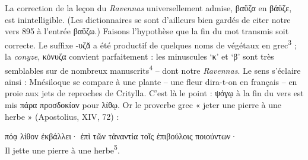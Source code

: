 \documentclass[12pt]{book}%
\newcommand{\italique}[1]{\textit{#1}}%
\newcommand{\citComm}[1]{\begin{quoting}[vskip=0pt] #1 \end{quoting}}%
\newcommand{\marqueur}[1]{\textsuperscript{#1}}%
\newenvironment{groupe}{%
\pstart%
\ledgroup%
}{%
\pend %
}%
\begin{document}
\begin{pages}
\begin{Leftside}
\begin{groupe}
{{La correction de la leçon du \italique{Ravennas} universellement admise, βαϋζα en βάϋζε, est inintelligible. (Les dictionnaires se sont d'ailleurs bien gardés de citer notre vers 895 à l'entrée βαΰζω.)
Faisons l'hypothèse que la fin du mot transmis soit correcte. Le suffixe -υζᾰ a été productif de quelques noms de végétaux en grec\marqueur{3} ; la \italique{conyze}, κόνυζα convient parfaitement : les minuscules `κ' et `β' sont très semblables sur de nombreux manuscrits\marqueur{4} -- dont notre \italique{Ravennas}. 
Le sens s'éclaire ainsi : Mnésiloque se compare à une plante -- une fleur dira-t-on en français -- en proie aux jets de reproches de Critylla. C'est là le point : ψόγῳ à la fin du vers est mis πάρα προσδοκίαν pour λίθῳ. Or le proverbe grec « jeter une pierre à une herbe » (Apostolius, XIV, 72) :%
\citComm{πόᾳ λίθον ἐκβάλλει· ἐπὶ τῶν τἀναντία τοῖς ἐπιβούλοις ποιούντων·\\
Il jette une pierre à une herbe\marqueur{5}.}%
%
}}
\end{groupe}
\end{Leftside}
\end{pages}
\end{document}
